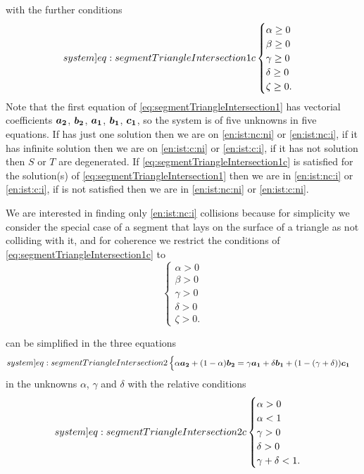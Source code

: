 \documentclass[dissertation.tex]{subfiles}
\begin{document}
with the further conditions
\begin{equation}\label[system]{eq:segmentTriangleIntersection1c}
  \begin{cases}
    \alpha \ge 0\\
    \beta \ge 0\\
    \gamma \ge 0\\
    \delta \ge 0\\
    \zeta \ge 0.
  \end{cases}
\end{equation}
Note that the first equation of
\cref{eq:segmentTriangleIntersection1} has vectorial coefficients
$\boldsymbol{a_2}$, $\boldsymbol{b_2}$, $\boldsymbol{a_1}$, $\boldsymbol{b_1}$, $\boldsymbol{c_1}$, so the
system is of five unknowns in five equations. If
 has just one solution then we are
on \cref{en:ist:nc:ni} or \cref{en:ist:nc:i}, if it has infinite
solution then we are on \cref{en:ist:c:ni} or \cref{en:ist:c:i}, if
it has not solution then $S$ or $T$ are degenerated. If
\cref{eq:segmentTriangleIntersection1c} is satisfied for the solution(s)
of \cref{eq:segmentTriangleIntersection1} then we are in
\cref{en:ist:nc:i} or \cref{en:ist:c:i}, if is not satisfied then we
are in \cref{en:ist:nc:ni} or \cref{en:ist:c:ni}.

We are interested in finding only \cref{en:ist:nc:i} collisions because for
simplicity we consider the special case of a segment that lays on the
surface of a triangle as not colliding with it, and for coherence we
restrict the conditions of \cref{eq:segmentTriangleIntersection1c} to
\begin{equation}
  \begin{cases}
    \alpha > 0\\
    \beta > 0\\
    \gamma > 0\\
    \delta > 0\\
    \zeta > 0.
  \end{cases}
\end{equation}

 can be simplified in the three
equations 
\begin{equation}\label[system]{eq:segmentTriangleIntersection2}
  \begin{cases}
    \alpha \ve{a_2} + (1-\alpha)\ve{b_2}=\gamma\ve{a_1}+\delta\ve{b_1}+(1-(\gamma+\delta))\ve{c_1} \\
  \end{cases}
\end{equation}
in the unknowns $\alpha$, $\gamma$ and $\delta$ with the relative conditions
\begin{equation}\label[system]{eq:segmentTriangleIntersection2c}
  \begin{cases}
    \alpha > 0\\
    \alpha < 1\\
    \gamma > 0\\
    \delta > 0\\
    \gamma+\delta<1.
  \end{cases}
\end{equation}
\end{document}
